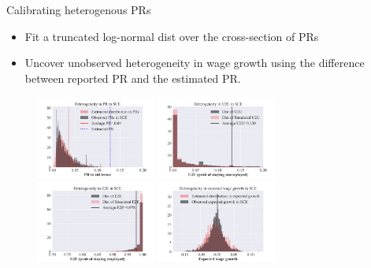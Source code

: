 \documentclass{beamer}
\begin{document}
\begin{frame}{Calibrating heterogenous PRs}
	\label{calibration_survey_risks}
	
	\begin{itemize}
		\item Fit a truncated log-normal dist over the cross-section of PRs 
		\item Uncover unobserved heterogeneity in wage growth using the difference between reported PR and the estimated PR. 
	\end{itemize}
	
	\begin{figure}
		\centering
		\label{fig:calibration_survey}
		\includegraphics[width=0.35\textwidth]{figures/log_normal_pr_fit.pdf} 
		\pause
		\includegraphics[width=0.35\textwidth]{figures/log_normal_u2u_fit.pdf} 
		\\
		\includegraphics[width=0.35\textwidth]{figures/log_normal_e2e_fit.pdf} 
		\pause
		\includegraphics[width=0.35\textwidth]{figures/log_normal_exp_fit.pdf} 
	\end{figure}
	
\end{frame}
\end{document}

